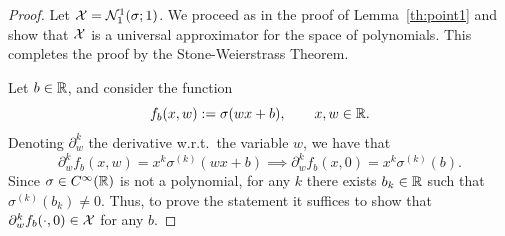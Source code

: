 
\begin{proof}
    Let $\mathcal{X}=\mathcal{N}_1^1(\sigma;1)$. We proceed as in the proof of Lemma~\ref{th:point1} and show that $\mathcal{X}$ is a universal approximator for the space of polynomials. This completes the proof by the Stone-Weierstrass Theorem.

    Let $b\in \mathbb{R}$, and consider the function 
    \begin{equation}
        f_b(x,w):=\sigma(wx+b), \qquad x,w\in \mathbb{R}.
    \end{equation}
    Denoting $\partial_w^k$ the  derivative w.r.t.~the variable $w$, we have that 
    \begin{equation}
        \partial^k_w f_b(x,w)=x^k\sigma^{(k)}(wx+b)
        \implies
         \partial^k_w f_b(x,0)=x^k\sigma^{(k)}(b).
    \end{equation}
    Since $\sigma\in C^\infty(\mathbb{R})$ is not a polynomial, for any $k$ there exists $b_k\in \mathbb{R}$ such that $\sigma^{(k)}(b_k)\neq 0$. 
    Thus, to prove the statement it suffices to show that $\partial_w^k f_{b}(\cdot,0)\in \mathcal{X}$ for any $b$. 


\end{proof}

